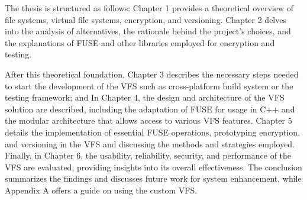 The thesis is structured as follows: Chapter 1 provides a theoretical overview of file systems, virtual file systems, encryption, and versioning.
Chapter 2 delves into the analysis of alternatives, the rationale behind the project's choices, and the explanations of FUSE and other libraries employed for encryption and testing.

After this theoretical foundation, Chapter 3 describes the necessary steps needed to start the development of the VFS such as cross-platform build system or the testing framework;
and In Chapter 4, the design and architecture of the VFS solution are described, including the adaptation of FUSE for usage in C++ and the modular architecture that allows access to various VFS features.
Chapter 5 details the implementation of essential FUSE operations, prototyping encryption, and versioning in the VFS and discussing the methods and strategies employed.
Finally, in Chapter 6, the usability, reliability, security, and performance of the VFS are evaluated, providing insights into its overall effectiveness.
The conclusion summarizes the findings and discusses future work for system enhancement, while Appendix A offers a guide on using the custom VFS.